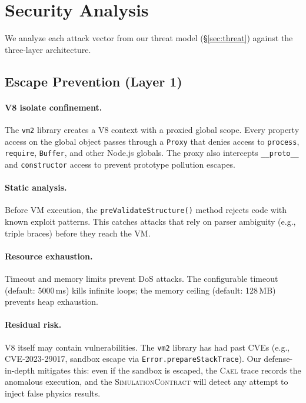 \documentclass[letterpaper,twocolumn,10pt]{article}
\newcommand{\cael}{\textsc{Cael}}
\newcommand{\simcontract}{\textsc{SimulationContract}}
\begin{document}
\section{Security Analysis}
\label{sec:security}

We analyze each attack vector from our threat model
(\S\ref{sec:threat}) against the three-layer architecture.

\subsection{Escape Prevention (Layer 1)}

\paragraph{V8 isolate confinement.} The \texttt{vm2} library creates
a V8 context with a proxied global scope. Every property access
on the global object passes through a \texttt{Proxy} that denies
access to \texttt{process}, \texttt{require}, \texttt{Buffer}, and
other Node.js globals. The proxy also intercepts
\texttt{\_\_proto\_\_} and \texttt{constructor} access to prevent
prototype pollution escapes.

\paragraph{Static analysis.} Before VM execution, the
\texttt{preValidateStructure()} method rejects code with known
exploit patterns. This catches attacks that rely on parser
ambiguity (e.g., triple braces) before they reach the VM.

\paragraph{Resource exhaustion.} Timeout and memory limits prevent
DoS attacks. The configurable timeout (default: 5000\,ms) kills
infinite loops; the memory ceiling (default: 128\,MB) prevents
heap exhaustion.

\paragraph{Residual risk.} V8 itself may contain vulnerabilities.
The \texttt{vm2} library has had past CVEs (e.g., CVE-2023-29017,
sandbox escape via \texttt{Error.prepareStackTrace}). Our
defense-in-depth mitigates this: even if the sandbox is escaped,
the \cael{} trace records the anomalous execution, and the
\simcontract{} will detect any attempt to inject false physics
results.
\end{document}
